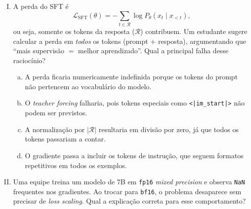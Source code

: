 \documentclass{dlproblemset}
\begin{document}
\begin{enumerate}[I)]
\begin{enumerate}[a)]
    \item $4$ \texttt{GB}.
    \item $32$ \texttt{GB}.
    \item $8$ \texttt{GB}.
    \item $24$ \texttt{GB}.
\end{enumerate}

\item A perda do SFT é
      \[
        \mathcal{L}_{\text{SFT}}(\theta) = -\sum_{t \in \mathcal{R}}
        \log P_\theta(x_t \mid x_{<t}),
      \]
      ou seja, somente os tokens da resposta ($\mathcal{R}$) contribuem. Um estudante
      sugere calcular a perda em \emph{todos} os tokens (prompt $+$ resposta),
      argumentando que ``mais supervisão $=$ melhor aprendizado''. Qual a
      principal falha desse raciocínio?

\begin{enumerate}[a)]
    \item A perda ficaria numericamente indefinida porque os tokens do prompt
          não pertencem ao vocabulário do modelo.
    \item O \textit{teacher forcing} falharia, pois tokens especiais como
          \texttt{<|im\_start|>} não podem ser previstos.
    \item A normalização por $|\mathcal{R}|$ resultaria em divisão por zero,
          já que todos os tokens passariam a contar.
    \item O gradiente passa a incluir os tokens de instrução, que seguem
          formatos repetitivos em todos os exemplos.
\end{enumerate}

\item Uma equipe treina um modelo de 7B em \texttt{fp16} \textit{mixed precision}
      e observa \texttt{NaN} frequentes nos gradientes. Ao trocar para
      \texttt{bf16}, o problema desaparece sem precisar de \textit{loss scaling}.
      Qual a explicação correta para esse comportamento?


\end{enumerate}
\end{document}
